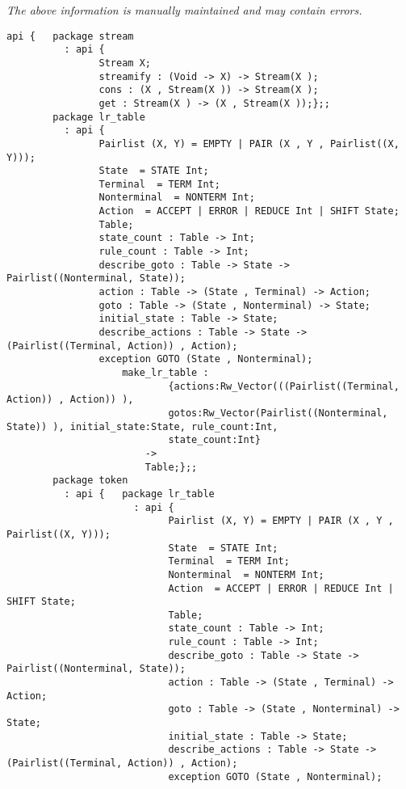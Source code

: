 \label{api:Lr\_Parser}

{\tiny \it The above information is manually maintained and may contain errors.}
\begin{verbatim}
api {   package stream
          : api {
                Stream X;
                streamify : (Void -> X) -> Stream(X );
                cons : (X , Stream(X )) -> Stream(X );
                get : Stream(X ) -> (X , Stream(X ));};;
        package lr_table
          : api {
                Pairlist (X, Y) = EMPTY | PAIR (X , Y , Pairlist((X, Y)));
                State  = STATE Int;
                Terminal  = TERM Int;
                Nonterminal  = NONTERM Int;
                Action  = ACCEPT | ERROR | REDUCE Int | SHIFT State;
                Table;
                state_count : Table -> Int;
                rule_count : Table -> Int;
                describe_goto : Table -> State -> Pairlist((Nonterminal, State));
                action : Table -> (State , Terminal) -> Action;
                goto : Table -> (State , Nonterminal) -> State;
                initial_state : Table -> State;
                describe_actions : Table -> State -> (Pairlist((Terminal, Action)) , Action);
                exception GOTO (State , Nonterminal);
                    make_lr_table :
                            {actions:Rw_Vector(((Pairlist((Terminal, Action)) , Action)) ),
                            gotos:Rw_Vector(Pairlist((Nonterminal, State)) ), initial_state:State, rule_count:Int,
                            state_count:Int}
                        ->
                        Table;};;
        package token
          : api {   package lr_table
                      : api {
                            Pairlist (X, Y) = EMPTY | PAIR (X , Y , Pairlist((X, Y)));
                            State  = STATE Int;
                            Terminal  = TERM Int;
                            Nonterminal  = NONTERM Int;
                            Action  = ACCEPT | ERROR | REDUCE Int | SHIFT State;
                            Table;
                            state_count : Table -> Int;
                            rule_count : Table -> Int;
                            describe_goto : Table -> State -> Pairlist((Nonterminal, State));
                            action : Table -> (State , Terminal) -> Action;
                            goto : Table -> (State , Nonterminal) -> State;
                            initial_state : Table -> State;
                            describe_actions : Table -> State -> (Pairlist((Terminal, Action)) , Action);
                            exception GOTO (State , Nonterminal);

\end{verbatim}

